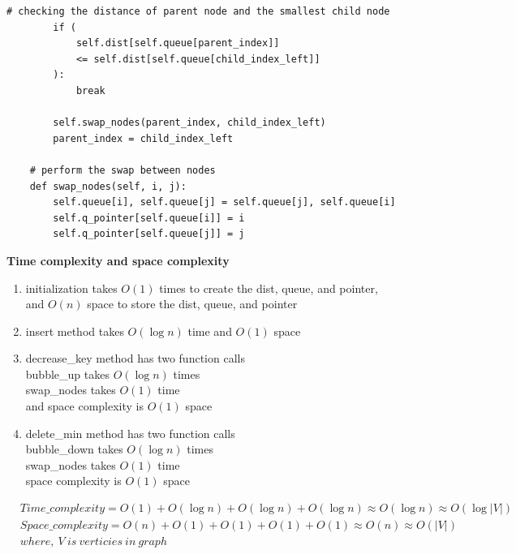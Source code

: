 \documentclass[12pt]{article}
\begin{document}
\begin{lstlisting}[style=mystyle]
        # checking the distance of parent node and the smallest child node
        if (
            self.dist[self.queue[parent_index]]
            <= self.dist[self.queue[child_index_left]]
        ):
            break

        self.swap_nodes(parent_index, child_index_left)
        parent_index = child_index_left

    # perform the swap between nodes
    def swap_nodes(self, i, j):
        self.queue[i], self.queue[j] = self.queue[j], self.queue[i]
        self.q_pointer[self.queue[i]] = i
        self.q_pointer[self.queue[j]] = j
    \end{lstlisting}

\newpage
\noindent\textbf{Time complexity and space complexity} \\
\begin{enumerate}
    \item initialization takes $O(1)$ times to create the dist, queue, and pointer, \\
    and $O(n)$ space to store the dist, queue, and pointer
    \item insert method takes $O(\log n)$ time and $O(1)$ space
    \item decrease\_key method has two function calls \\
    bubble\_up takes $O(\log n)$ times \\
    swap\_nodes takes $O(1)$ time \\
    and space complexity is $O(1)$ space
    \item delete\_min method has two function calls \\
    bubble\_down takes $O(\log n)$ times\\
    swap\_nodes takes $O(1)$ time\\
    space complexity is $O(1)$ space 
\end{enumerate}
\begin{equation} %
\begin{split}
    &Time\_complexity = O(1) + O(\log n) + O(\log n) + O(\log n) \approx O(\log n) \approx O(\log |V|) \\
    &Space\_complexity = O(n) + O(1) + O(1) + O(1) + O(1) \approx O(n) \approx O(|V|) \\
    &where,\ V \ is \ verticies \ in \ graph
\end{split}
\end{equation}

\newpage
\end{document}

